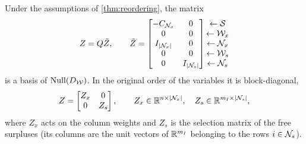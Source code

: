 \begin{theorem} \label{thm:basis}
Under the assumptions of \cref{thm:reordering}, the matrix
\begin{equation} \label{eq:Z-reordered}
Z = Q\tilde Z,\qquad
\tilde Z = \begin{bmatrix}
-C_{\mathcal{N}_x} & 0\\
0 & 0\\
I_{|\mathcal{N}_x|} & 0\\
0 & 0\\
0 & I_{|\mathcal{N}_s|}
\end{bmatrix}
\begin{matrix} \leftarrow\mathcal{S}\\ \leftarrow\mathcal{W}_x\\ \leftarrow\mathcal{N}_x\\ \leftarrow\mathcal{W}_s\\ \leftarrow\mathcal{N}_s\end{matrix}
\end{equation}
is a basis of $\operatorname{Null}(D_{\mathcal{W}})$. In the original order of the variables it is block-diagonal,
\begin{equation} \label{eq:Z-blocks}
Z = \begin{bmatrix} Z_x & 0\\ 0 & Z_s\end{bmatrix},
\qquad Z_x\in\mathbb{R}^{n\times|\mathcal{N}_x|},\quad Z_s\in\mathbb{R}^{m_I\times|\mathcal{N}_s|},
\end{equation}
where $Z_x$ acts on the column weights and $Z_s$ is the selection matrix of the free surpluses
(its columns are the unit vectors of $\mathbb{R}^{m_I}$ belonging to the rows $i\in\mathcal{N}_s$).
\end{theorem}

